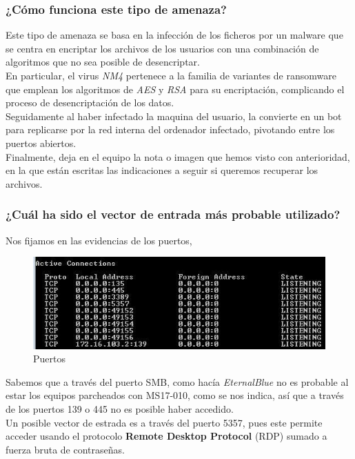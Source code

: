\documentclass[12pt,twoside]{article}
\begin{document}
\subsubsection*{¿Cómo funciona este tipo de amenaza?}
Este tipo de amenaza se basa en la infección de los ficheros por un  malware que se centra en encriptar los archivos de los usuarios con una combinación de algoritmos que no sea posible de desencriptar.\\
En particular, el virus \textit{NM4} pertenece a la familia de variantes de ransomware que emplean los algoritmos de \textit{AES} y \textit{RSA} para su  encriptación, complicando el proceso de desencriptación de los datos. \\ 
Seguidamente al haber infectado la maquina del usuario, la convierte en un bot para  replicarse por la red interna del ordenador infectado, pivotando entre los puertos abiertos. \\
Finalmente, deja en el equipo la nota o imagen que hemos visto con anterioridad, en la que están escritas las indicaciones a seguir si queremos recuperar los archivos.


\subsubsection*{¿Cuál ha sido el vector de entrada más probable utilizado?}
Nos fijamos en las evidencias de los puertos,
\begin{figure}[h]
    \centering
    \includegraphics[scale=0.7]{./imagenes/spain (1)}
    \caption{Puertos}
\end{figure}
Sabemos que a  través del puerto SMB, como hacía \textit{EternalBlue} no es probable al estar los equipos parcheados con MS17-010, como se nos indica, así que a través de los puertos 139 o 445 no es posible haber accedido. \\ 
Un posible vector de estrada es a través del puerto 5357, pues este permite acceder usando el protocolo \textbf{Remote Desktop Protocol} (RDP) sumado a fuerza bruta de contraseñas.
\end{document}

